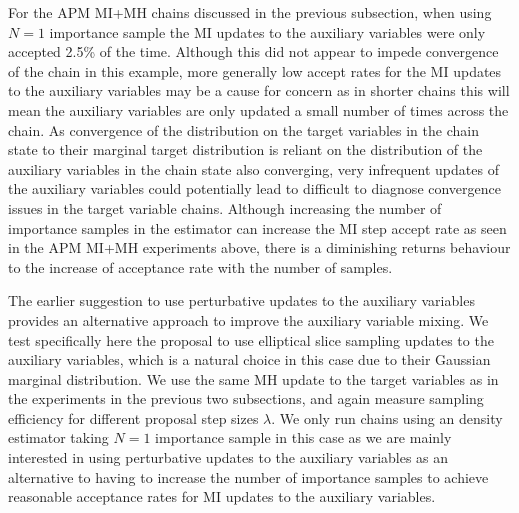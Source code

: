 For the \ac{APM} \ac{MI}+\ac{MH} chains discussed in the previous subsection, when using $N=1$ importance sample the \ac{MI} updates to the auxiliary variables were only accepted 2.5\% of the time. Although this did not appear to impede convergence of the chain in this example, more generally low accept rates for the \ac{MI} updates to the auxiliary variables may be a cause for concern as in shorter chains this will mean the auxiliary variables are only updated a small number of times across the chain. As convergence of the distribution on the target variables in the chain state to their marginal target distribution is reliant on the distribution of the auxiliary variables in the chain state also converging, very infrequent updates of the auxiliary variables could potentially lead to difficult to diagnose convergence issues in the target variable chains. Although increasing the number of importance samples in the estimator can increase the \ac{MI} step accept rate as seen in the \ac{APM} \ac{MI}+\ac{MH} experiments above, there is a diminishing returns behaviour to the increase of acceptance rate with the number of samples.%

The earlier suggestion to use perturbative updates to the auxiliary variables provides an alternative approach to improve the auxiliary variable mixing. We test specifically here the proposal to use elliptical slice sampling updates to the auxiliary variables, which is a natural choice in this case due to their Gaussian marginal distribution. We use the same \ac{MH} update to the target variables as in the experiments in the previous two subsections, and again measure sampling efficiency for different proposal step sizes $\lambda$. We only run chains using an density estimator taking $N=1$ importance sample in this case as we are mainly interested in using perturbative updates to the auxiliary variables as an alternative to having to increase the number of importance samples to achieve reasonable acceptance rates for \ac{MI} updates to the auxiliary variables.

